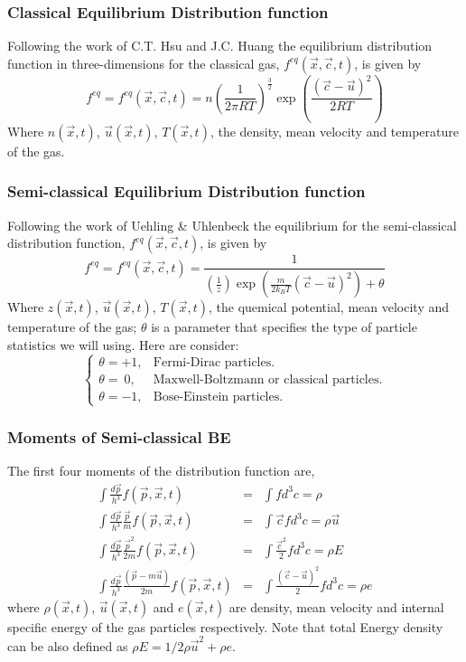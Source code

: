 \begin{frame} \frametitle{Classical Equilibrium Distribution function}
	Following the work of C.T. Hsu \cite{ISI:000303761300021} and J.C. Huang \cite{Huang2011261} the equilibrium distribution function in three-dimensions for the classical gas, $f^{eq}(\vec{x},\vec{c},t)$, is given by
	\begin{equation}
	f^{eq}=f^{eq}(\vec{x},\vec{c},t)=n \left( \frac{1}{2 \pi RT} \right)^{\frac{3}{2}} \exp\left({\frac{(\vec{c}-\vec{u})^2}{2 R T}}
\right)
	\label{eq:classical_feq}
	\end{equation}
	Where $n(\vec{x},t)$, $\vec{u}(\vec{x},t)$, $T(\vec{x},t)$, the density, mean velocity and temperature of the gas.
\end{frame}


\begin{frame} \frametitle{Semi-classical Equilibrium Distribution function}
	Following the work of Uehling \& Uhlenbeck \cite{PhysRev.43.552} the equilibrium for the semi-classical distribution function, $f^{eq}(\vec{x},\vec{c},t)$, is given by
	\begin{equation}
	f^{eq}=f^{eq}(\vec{x},\vec{c},t)=\frac{1}{(\frac{1}{z})\exp\left({\frac{m}{2 k_B T}(\vec{c}-\vec{u})^2}\right)+\theta}
	\label{eq:semiclassical_feq}
	\end{equation}
	Where $z(\vec{x},t)$, $\vec{u}(\vec{x},t)$, $T(\vec{x},t)$, the quemical potential, mean velocity and temperature of the gas; $\theta$ is a parameter that specifies the type of particle statistics we will using. Here are consider:
	\[
		\begin{cases}
		\theta = +1, 	& \text{Fermi-Dirac particles.} \\
		\theta = \ 0,	& \text{Maxwell-Boltzmann or classical particles.} \\
		\theta = -1, 	& \text{Bose-Einstein particles.}
		\end{cases}
	\]
\end{frame}
	
\begin{frame} \frametitle{Moments of Semi-classical BE}
	The first four moments of the distribution function are,
	\begin{eqnarray}
	\int \frac{d\vec{p}}{h^3} f(\vec{p},\vec{x},t) &=& \int f d^3 c = \rho \\
	\int \frac{d\vec{p}}{h^3} \frac{\vec{p}}{m} f(\vec{p},\vec{x},t) &=& \int \vec{c} f d^3 c = \rho \vec{u} \\
	\int \frac{d\vec{p}}{h^3} \frac{\vec{p}^2}{2m} f(\vec{p},\vec{x},t) &=& \int \frac{\vec{c}^2}{2} f d^3 c = \rho E \\
	\int \frac{d\vec{p}}{h^3} \frac{(\vec{p}-m\vec{u})}{2m} f(\vec{p},\vec{x},t) &=& \int \frac{(\vec{c}-\vec{u})^2}{2} f d^3 c = \rho e 
	\end{eqnarray}
	where $\rho(\vec{x},t)$,  $\vec{u}(\vec{x},t)$ and $e(\vec{x},t)$ are density, mean velocity and internal specific energy of the gas particles respectively. Note that total Energy density can be also defined as $\rho E = 1/2 \rho \vec{u}^2 + \rho e$.
\end{frame}

